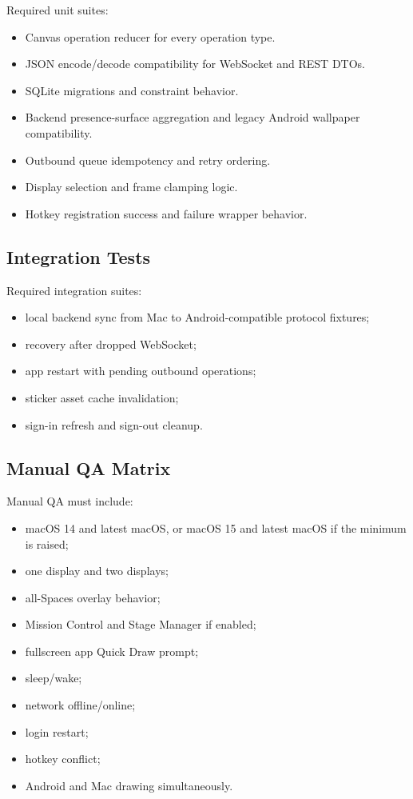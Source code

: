 \documentclass[11pt]{article}
\begin{document}
Required unit suites:
\begin{itemize}
  \item Canvas operation reducer for every operation type.
  \item JSON encode/decode compatibility for WebSocket and REST DTOs.
  \item SQLite migrations and constraint behavior.
  \item Backend presence-surface aggregation and legacy Android wallpaper compatibility.
  \item Outbound queue idempotency and retry ordering.
  \item Display selection and frame clamping logic.
  \item Hotkey registration success and failure wrapper behavior.
\end{itemize}

\subsection{Integration Tests}

Required integration suites:
\begin{itemize}
  \item local backend sync from Mac to Android-compatible protocol fixtures;
  \item recovery after dropped WebSocket;
  \item app restart with pending outbound operations;
  \item sticker asset cache invalidation;
  \item sign-in refresh and sign-out cleanup.
\end{itemize}

\subsection{Manual QA Matrix}

Manual QA must include:
\begin{itemize}
  \item macOS 14 and latest macOS, or macOS 15 and latest macOS if the minimum is raised;
  \item one display and two displays;
  \item all-Spaces overlay behavior;
  \item Mission Control and Stage Manager if enabled;
  \item fullscreen app Quick Draw prompt;
  \item sleep/wake;
  \item network offline/online;
  \item login restart;
  \item hotkey conflict;
  \item Android and Mac drawing simultaneously.
\end{itemize}
\end{document}
